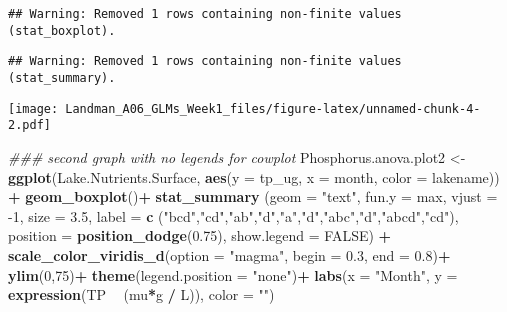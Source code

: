 \documentclass[]{article}
\newenvironment{Shaded}{\begin{snugshade}}{\end{snugshade}}
\newcommand{\CommentTok}[1]{\textcolor[rgb]{0.56,0.35,0.01}{\textit{#1}}}
\newcommand{\DataTypeTok}[1]{\textcolor[rgb]{0.13,0.29,0.53}{#1}}
\newcommand{\DecValTok}[1]{\textcolor[rgb]{0.00,0.00,0.81}{#1}}
\newcommand{\FloatTok}[1]{\textcolor[rgb]{0.00,0.00,0.81}{#1}}
\newcommand{\KeywordTok}[1]{\textcolor[rgb]{0.13,0.29,0.53}{\textbf{#1}}}
\newcommand{\NormalTok}[1]{#1}
\newcommand{\OperatorTok}[1]{\textcolor[rgb]{0.81,0.36,0.00}{\textbf{#1}}}
\newcommand{\OtherTok}[1]{\textcolor[rgb]{0.56,0.35,0.01}{#1}}
\newcommand{\StringTok}[1]{\textcolor[rgb]{0.31,0.60,0.02}{#1}}
\begin{document}
\begin{verbatim}
## Warning: Removed 1 rows containing non-finite values (stat_boxplot).
\end{verbatim}

\begin{verbatim}
## Warning: Removed 1 rows containing non-finite values (stat_summary).
\end{verbatim}

\texttt{[image: Landman\_A06\_GLMs\_Week1\_files/figure-latex/unnamed-chunk-4-2.pdf]}

\begin{Shaded}
\begin{Highlighting}[]
\CommentTok{### second graph with no legends for cowplot }
\NormalTok{Phosphorus.anova.plot2 <-}\StringTok{ }\KeywordTok{ggplot}\NormalTok{(Lake.Nutrients.Surface, }
                              \KeywordTok{aes}\NormalTok{(}\DataTypeTok{y =}\NormalTok{ tp_ug, }\DataTypeTok{x =}\NormalTok{ month, }\DataTypeTok{color =}\NormalTok{ lakename)) }\OperatorTok{+}
\StringTok{  }\KeywordTok{geom_boxplot}\NormalTok{()}\OperatorTok{+}
\StringTok{  }\KeywordTok{stat_summary}\NormalTok{ (}\DataTypeTok{geom =} \StringTok{"text"}\NormalTok{, }\DataTypeTok{fun.y =}\NormalTok{ max, }\DataTypeTok{vjust =} \DecValTok{-1}\NormalTok{, }\DataTypeTok{size =} \FloatTok{3.5}\NormalTok{,}
               \DataTypeTok{label =} \KeywordTok{c}\NormalTok{ (}\StringTok{"bcd"}\NormalTok{,}\StringTok{"cd"}\NormalTok{,}\StringTok{"ab"}\NormalTok{,}\StringTok{"d"}\NormalTok{,}\StringTok{"a"}\NormalTok{,}\StringTok{"d"}\NormalTok{,}\StringTok{"abc"}\NormalTok{,}\StringTok{"d"}\NormalTok{,}\StringTok{"abcd"}\NormalTok{,}\StringTok{"cd"}\NormalTok{), }
               \DataTypeTok{position =} \KeywordTok{position_dodge}\NormalTok{(}\FloatTok{0.75}\NormalTok{),}
               \DataTypeTok{show.legend =} \OtherTok{FALSE}\NormalTok{) }\OperatorTok{+}
\StringTok{    }\KeywordTok{scale_color_viridis_d}\NormalTok{(}\DataTypeTok{option =} \StringTok{"magma"}\NormalTok{, }\DataTypeTok{begin =} \FloatTok{0.3}\NormalTok{, }\DataTypeTok{end =} \FloatTok{0.8}\NormalTok{)}\OperatorTok{+}
\StringTok{  }\KeywordTok{ylim}\NormalTok{(}\DecValTok{0}\NormalTok{,}\DecValTok{75}\NormalTok{)}\OperatorTok{+}
\StringTok{  }\KeywordTok{theme}\NormalTok{(}\DataTypeTok{legend.position =} \StringTok{"none"}\NormalTok{)}\OperatorTok{+}
\StringTok{  }\KeywordTok{labs}\NormalTok{(}\DataTypeTok{x =} \StringTok{"Month"}\NormalTok{, }\DataTypeTok{y =} \KeywordTok{expression}\NormalTok{(TP }\OperatorTok{~}\StringTok{ }\NormalTok{(mu}\OperatorTok{*}\NormalTok{g }\OperatorTok{/}\StringTok{ }\NormalTok{L)), }\DataTypeTok{color =} \StringTok{""}\NormalTok{)}


\end{Highlighting}
\end{Shaded}
\end{document}
